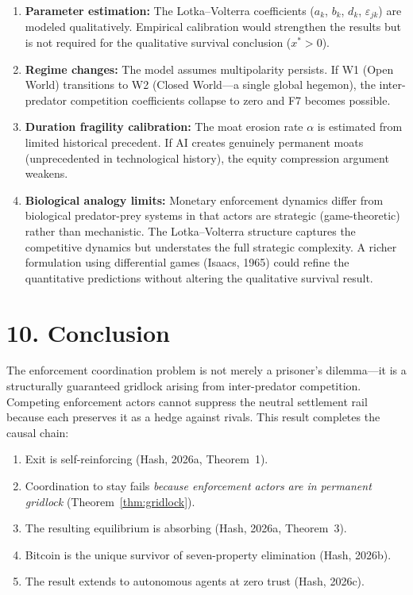 \documentclass[12pt]{article}
\theoremstyle{definition}
\theoremstyle{remark}
\begin{document}
\begin{enumerate}[label=(\roman*)]
  \item \textbf{Parameter estimation:} The Lotka--Volterra coefficients
    ($a_k$, $b_k$, $d_k$, $\varepsilon_{jk}$) are modeled
    qualitatively. Empirical calibration would strengthen the results
    but is not required for the qualitative survival conclusion
    ($x^{*} > 0$).
  \item \textbf{Regime changes:} The model assumes multipolarity
    persists. If W1 (Open World) transitions to W2 (Closed World---a
    single global hegemon), the inter-predator competition coefficients
    collapse to zero and F7 becomes possible.
  \item \textbf{Duration fragility calibration:} The moat erosion rate
    $\alpha$ is estimated from limited historical precedent. If AI
    creates genuinely permanent moats (unprecedented in technological
    history), the equity compression argument weakens.
  \item \textbf{Biological analogy limits:} Monetary enforcement
    dynamics differ from biological predator-prey systems in that
    actors are strategic (game-theoretic) rather than mechanistic. The
    Lotka--Volterra structure captures the competitive dynamics but
    understates the full strategic complexity. A richer formulation
    using differential games (Isaacs, 1965) could refine the
    quantitative predictions without altering the qualitative survival
    result.
\end{enumerate}

\section{10. Conclusion}\label{sec:conclusion}

The enforcement coordination problem is not merely a prisoner's
dilemma---it is a structurally guaranteed gridlock arising from
inter-predator competition. Competing enforcement actors cannot suppress
the neutral settlement rail because each preserves it as a hedge against
rivals. This result completes the causal chain:

\begin{enumerate}
  \item Exit is self-reinforcing (Hash, 2026a, Theorem~1).
  \item Coordination to stay fails \emph{because enforcement actors are
    in permanent gridlock} (Theorem~\ref{thm:gridlock}).
  \item The resulting equilibrium is absorbing (Hash, 2026a, Theorem~3).
  \item Bitcoin is the unique survivor of seven-property elimination
    (Hash, 2026b).
  \item The result extends to autonomous agents at zero trust (Hash,
    2026c).
\end{enumerate}
\end{document}
